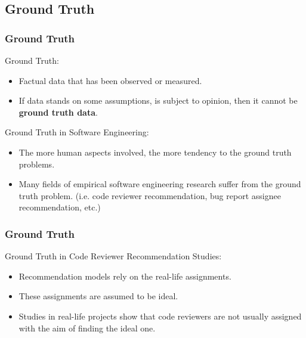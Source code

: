 \documentclass{beamer}
\begin{document}
\subsection{Ground Truth}
\begin{frame}
\frametitle{\large Ground Truth}

    \begin{block}{Ground Truth:}
    \begin{itemize}
        \item Factual data that has been observed or measured.
        \item If data stands on some assumptions, is subject to opinion, then it cannot be \textbf{ground truth data}.
    \end{itemize}    
    \end{block}
    \pause
    \begin{block}{Ground Truth in Software Engineering:}
    \begin{itemize}
    \item The more human aspects involved, the more tendency to the ground truth problems.
    \item Many fields of empirical software engineering research suffer from the ground truth problem. (i.e. code reviewer recommendation, bug report assignee recommendation, etc.)   
    \end{itemize}    
    \end{block}    
\end{frame}


\begin{frame}
\frametitle{\large Ground Truth}

    \begin{block}{Ground Truth in Code Reviewer Recommendation Studies:}
    \begin{itemize}
        \item Recommendation models rely on the real-life assignments.
        \item These assignments are assumed to be ideal.
        \item Studies in real-life projects show that code reviewers are not usually assigned with the aim of finding the ideal one.
    \end{itemize}    
    \end{block}

\end{frame}
\end{document}
